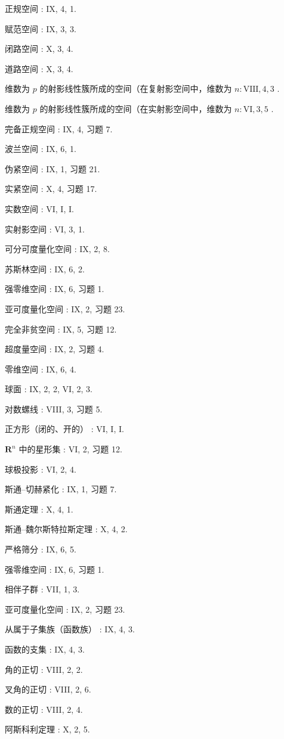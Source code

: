 正规空间 : IX, 4, 1.

赋范空间 : IX, 3, 3.

闭路空间 : X, 3, 4.

道路空间 : X, 3, 4.

维数为 \(p\) 的射影线性簇所成的空间（在复射影空间中，维数为 \(n: \text{VIII}, 4, 3\) .

维数为 \(p\) 的射影线性簇所成的空间（在实射影空间中，维数为 \(n: \mathrm{VI}, 3, 5\) .

完备正规空间 : IX, 4, 习题 7.

波兰空间 : IX, 6, 1.

伪紧空间 : IX, 1, 习题 21.

实紧空间 : X, 4, 习题 17.

实数空间 : VI, I, I.

实射影空间 : VI, 3, 1.

可分可度量化空间 : IX, 2, 8.

苏斯林空间 : IX, 6, 2.

强零维空间 : IX, 6, 习题 1.

亚可度量化空间 : IX, 2, 习题 23.

完全非贫空间 : IX, 5, 习题 12.

超度量空间 : IX, 2, 习题 4.

零维空间 : IX, 6, 4.

球面 : IX, 2, 2, VI, 2, 3.

对数螺线 : VIII, 3, 习题 5.

正方形（闭的、开的） : VI, I, I.

\(\mathbf{R}^n\) 中的星形集 : VI, 2, 习题 12.

球极投影 : VI, 2, 4.

斯通–切赫紧化 : IX, 1, 习题 7.

斯通定理 : X, 4, 1.

斯通–魏尔斯特拉斯定理 : X, 4, 2.

严格筛分 : IX, 6, 5.

强零维空间 : IX, 6, 习题 1.

相伴子群 : VII, 1, 3.

亚可度量化空间 : IX, 2, 习题 23.

从属于子集族（函数族） : IX, 4, 3.

函数的支集 : IX, 4, 3.

角的正切 : VIII, 2, 2.

叉角的正切 : VIII, 2, 6.

数的正切 : VIII, 2, 4.

阿斯科利定理 : X, 2, 5.

